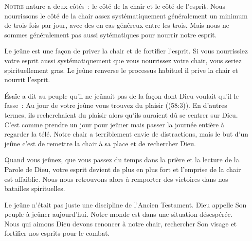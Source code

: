 


\lettrine{N}{otre} nature a deux côtés~:
 le côté de la chair et le côté de l'esprit.
 Nous nourrissons le côté de la chair assez systématiquement
 \ocadr généralement un minimum de trois fois par jour,
 avec des en-cas généreux entre les trois.
 Mais nous ne sommes généralement pas aussi sytématiques
 pour nourrir notre esprit. 

Le jeûne est une fa\c{c}on de priver la chair et de fortifier l'esprit.
 Si vous nourrissiez votre esprit aussi systématiquement
 que vous nourrissez votre chair, vous seriez spirituellement gras.
 Le jeûne renverse le processus habituel
 \ocadr il prive la chair et nourrit l'esprit. 


Ésaïe a dit au peuple qu'il ne jeûnait pas de la fa\c{c}on dont Dieu
 voulait qu'il le fasse~:
 \Og Au jour de votre jeûne vous trouvez du plaisir \Fg{}
 ((58:3)). En d'autres termes, ils recherchaient du plaisir
 alors qu'ils auraient dû se centrer sur Dieu. C'est comme prendre
 un jour pour jeûner mais passer la journée entière à regarder la télé.
 Notre chair a terriblement envie de distractions, mais le but d'un jeûne
 c'est de remettre la chair à sa place et de rechercher Dieu. 

Quand vous jeûnez, que vous passez du temps dans la prière
 et la lecture de la Parole de Dieu, votre esprit devient de plus en plus
 fort et l'emprise de la chair est affaiblie. Nous nous retrouvons alors
 à remporter des victoires dans nos batailles spirituelles. 

Le jeûne n'était pas juste une discipline de l'Ancien Testament.
 Dieu appelle Son peuple à jeûner aujourd'hui.
 Notre monde est dans une situation désespérée.
 Nous qui aimons Dieu devons renoncer à notre chair,
 rechercher Son visage et fortifier nos esprits pour le combat. 

\dvrule



